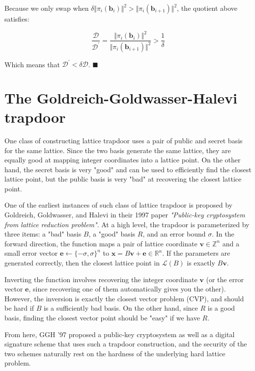 \documentclass[letterpaper,12pt]{article}
\begin{document}
Because we only swap when $\delta \Vert \pi_i(\mathbf{b}_i) \Vert^2 > \Vert \pi_i(\mathbf{b}_{i+1}) \Vert^2$, the quotient above satisfies:

$$
\frac{\mathcal{D}}{\mathcal{D}^\prime} 
= \frac{\Vert\pi_i(\mathbf{b}_{i})\Vert^2}{\Vert\pi_i(\mathbf{b}_{i+1})\Vert^2}
> \frac{1}{\delta}
$$

Which means that $\mathcal{D}^\prime < \delta \mathcal{D}$. $\blacksquare$

\section{The Goldreich-Goldwasser-Halevi trapdoor}
One class of constructing lattice trapdoor uses a pair of public and secret basis for the same lattice. Since the two basis generate the same lattice, they are equally good at mapping integer coordinates into a lattice point. On the other hand, the secret basis is very "good" and can be used to efficiently find the closest lattice point, but the public basis is very "bad" at recovering the closest lattice point.

One of the earliest instances of such class of lattice trapdoor is proposed by Goldreich, Goldwasser, and Halevi in their 1997 paper \textit{"Public-key cryptosystem from lattice reduction problem"}. At a high level, the trapdoor is parameterized by three items: a "bad" basis $B$, a "good" basis $R$, and an error bound $\sigma$. In the forward direction, the function maps a pair of lattice coordinate $\mathbf{v} \in \mathbb{Z}^n$ and a small error vector $\mathbf{e} \leftarrow \{ -\sigma, \sigma \}^n$ to $\mathbf{x} = B\mathbf{v} + \mathbf{e} \in \mathbb{R}^n$. If the parameters are generated correctly, then the closest lattice point in $\mathcal{L}(B)$ is exactly $B\mathbf{v}$.

Inverting the function involves recovering the integer coordinate $\mathbf{v}$ (or the error vector $\mathbf{e}$, since recovering one of them automatically gives you the other). However, the inversion is exactly the closest vector problem (CVP), and should be hard if $B$ is a sufficiently bad basis. On the other hand, since $R$ is a good basis, finding the closest vector point should be "easy" if we have $R$.

From here, GGH '97 proposed a public-key cryptosystem as well as a digital signature scheme that uses such a trapdoor construction, and the security of the two schemes naturally rest on the hardness of the underlying hard lattice problem.
\end{document}
